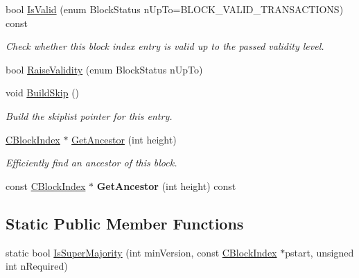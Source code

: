 \begin{DoxyCompactItemize}
bool \mbox{\hyperlink{class_c_block_index_ad8b5a6560e7c0d4222066e2922178683}{Is\+Valid}} (enum Block\+Status n\+Up\+To=B\+L\+O\+C\+K\+\_\+\+V\+A\+L\+I\+D\+\_\+\+T\+R\+A\+N\+S\+A\+C\+T\+I\+O\+NS) const
\begin{DoxyCompactList}\small\item\em Check whether this block index entry is valid up to the passed validity level. \end{DoxyCompactList}\item 
bool \mbox{\hyperlink{class_c_block_index_a076aff906933e9d75a37aa9b81c01384}{Raise\+Validity}} (enum Block\+Status n\+Up\+To)
\item 
\mbox{\label{class_c_block_index_a21209a71e50daf10e283bd4049e46f64}} 
void \mbox{\hyperlink{class_c_block_index_a21209a71e50daf10e283bd4049e46f64}{Build\+Skip}} ()
\begin{DoxyCompactList}\small\item\em Build the skiplist pointer for this entry. \end{DoxyCompactList}\item 
\mbox{\label{class_c_block_index_ae1f702384690c6b8302e026a84172ef3}} 
\mbox{\hyperlink{class_c_block_index}{C\+Block\+Index}} $\ast$ \mbox{\hyperlink{class_c_block_index_ae1f702384690c6b8302e026a84172ef3}{Get\+Ancestor}} (int height)
\begin{DoxyCompactList}\small\item\em Efficiently find an ancestor of this block. \end{DoxyCompactList}\item 
\mbox{\label{class_c_block_index_a7a58b33d64fde3df36c6e61371d031cc}} 
const \mbox{\hyperlink{class_c_block_index}{C\+Block\+Index}} $\ast$ {\bfseries Get\+Ancestor} (int height) const
\end{DoxyCompactItemize}
\subsection*{Static Public Member Functions}
\begin{DoxyCompactItemize}
\item 
static bool \mbox{\hyperlink{class_c_block_index_a96fbd9608432d92c27d4314f32341988}{Is\+Super\+Majority}} (int min\+Version, const \mbox{\hyperlink{class_c_block_index}{C\+Block\+Index}} $\ast$pstart, unsigned int n\+Required)
\end{DoxyCompactItemize}
